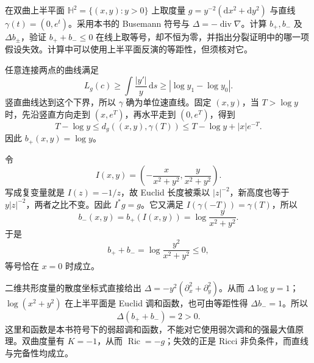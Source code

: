 \begin{optionalexercise}\label{g3:ex:hyperbolic-busemann-failure}
	在双曲上半平面 \(\mathbb H^2=\{(x,y):y>0\}\) 上取度量 \(g=y^{-2}(\mathrm dx^2+\mathrm dy^2)\) 与直线 \(\gamma(t)=(0,e^t)\)。采用本书的 Busemann 符号与 \(\Delta=-\operatorname{div}\nabla\)。计算 \(b_+,b_-\) 及 \(\Delta b_\pm\)，验证 \(b_++b_-\le0\) 在线上取等号，却不恒为零，并指出分裂证明中的哪一项假设失效。计算中可以使用上半平面反演的等距性，但须核对它。
\end{optionalexercise}
\begin{solution}
	任意连接两点的曲线满足
	\[
		L_g(c)\ge\int\frac{|y'|}{y}\,\mathrm ds
		\ge|\log y_1-\log y_0|.
	\]
	竖直曲线达到这个下界，所以 \(\gamma\) 确为单位速直线。固定 \((x,y)\)，当 \(T>\log y\) 时，先沿竖直方向走到 \((x,e^T)\)，再水平走到 \((0,e^T)\)，得到
	\[
		T-\log y\le d_g((x,y),\gamma(T))
		\le T-\log y+|x|e^{-T}.
	\]
	因此 \(b_+(x,y)=\log y\)。

	令
	\[
		I(x,y)=\left(-\frac{x}{x^2+y^2},\frac{y}{x^2+y^2}\right).
	\]
	写成复变量就是 \(I(z)=-1/z\)，故 Euclid 长度被乘以 \(|z|^{-2}\)，新高度也等于 \(y|z|^{-2}\)，两者之比不变。因此 \(I^*g=g\)。它又满足 \(I(\gamma(-T))=\gamma(T)\)，所以
	\[
		b_-(x,y)=b_+(I(x,y))
		=\log\frac{y}{x^2+y^2}.
	\]
	于是
	\[
		b_++b_-=
		\log\frac{y^2}{x^2+y^2}\le0,
	\]
	等号恰在 \(x=0\) 时成立。

	二维共形度量的散度坐标式直接给出
	\(\Delta=-y^2(\partial_x^2+\partial_y^2)\)。从而 \(\Delta\log y=1\)；\(\log(x^2+y^2)\) 在上半平面是 Euclid 调和函数，也可由等距性得 \(\Delta b_-=1\)。所以
	\[
		\Delta(b_++b_-)=2>0.
	\]
	这里和函数是本书符号下的弱超调和函数，不能对它使用弱次调和的强最大值原理。双曲度量有 \(K=-1\)，从而 \(\operatorname{Ric}=-g\)；失效的正是 Ricci 非负条件，而直线与完备性均成立。
\end{solution}

